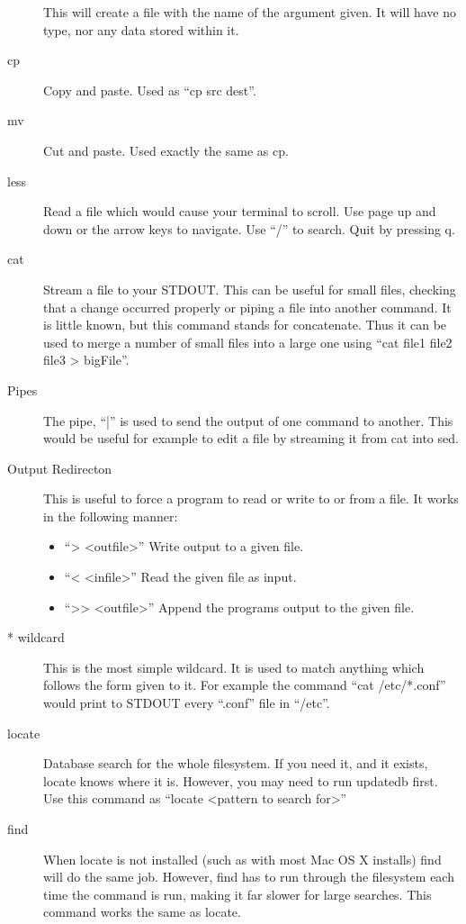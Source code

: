\begin{description}
				This will create a file with the name of the argument given.
				It will have no type, nor any data stored within it.
			\item[cp]
				Copy and paste. Used as ``cp src dest''.
			\item[mv]
				Cut and paste. Used exactly the same as cp.
			\item[less]
				Read a file which would cause your terminal to scroll.
				Use page up and down or the arrow keys to navigate.
				Use ``/'' to search.
				Quit by pressing q.
			\item[cat]
				Stream a file to your STDOUT.
				This can be useful for small files, checking that a change occurred properly or piping a file into another command.
				It is little known, but this command stands for concatenate.
				Thus it can be used to merge a number of small files into a large one using ``cat file1 file2 file3 > bigFile''.
			\item[Pipes]
				The pipe, ``|'' is used to send the output of one command to another.
				This would be useful for example to edit a file by streaming it from cat into sed.
			\item[Output Redirecton]
				This is useful to force a program to read or write to or from a file.
				It works in the following manner:
				\begin{itemize}
					\item ``> <outfile>'' Write output to a given file.
					\item ``< <infile>'' Read the given file as input.
					\item ``>{}> <outfile>'' Append the programs output to the given file.
				\end{itemize}
			\item[\** wildcard]
				This is the most simple wildcard.
				It is used to match anything which follows the form given to it.
				For example the command ``cat /etc/\**.conf'' would print to STDOUT every ``.conf'' file in ``/etc''.
			\item[locate]
				Database search for the whole filesystem.
				If you need it, and it exists, locate knows where it is.
				However, you may need to run updatedb first.
				Use this command as ``locate <pattern to search for>''
			\item[find]
				When locate is not installed (such as with most Mac OS X installs) find will do the same job.
				However, find has to run through the filesystem each time the command is run, making it far slower for large searches.
				This command works the same as locate.

\end{description}
